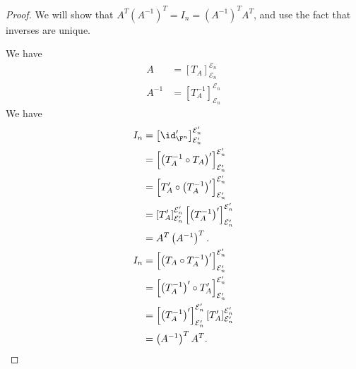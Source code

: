 \documentclass[10pt]{mypackage}
\begin{document}
\begin{proof}
  We will show that $A^{T} \left(A^{-1}\right)^{T} = I_n = \left(A^{-1}\right)^{T} A^T$, and use the fact that inverses are unique.\newline

  We have
  \begin{align*}
    A &= \left[T_A\right]_{\mathcal{E}_n}^{\mathcal{E}_n}\\
    A^{-1} &= \left[T_A^{-1}\right]_{\mathcal{E}_n}^{\mathcal{E}_n}
  \end{align*}
  We have
  \begin{align*}
    I_n &= \left[\id_{\F^n}'\right]_{\mathcal{E}_n'}^{\mathcal{E}_n'}\\
        &= \left[\left(T_A^{-1}\circ T_A\right)'\right]_{\mathcal{E}_n'}^{\mathcal{E}_n'}\\
        &= \left[T_A'\circ \left(T_A^{-1}\right)'\right]_{\mathcal{E}_n'}^{\mathcal{E}_n'}\\
        &= \left[T_A'\right]_{\mathcal{E}_n'}^{\mathcal{E}_n'}\left[\left(T_A^{-1}\right)'\right]_{\mathcal{E}_n'}^{\mathcal{E}_n'}\\
        &= A^T\left(A^{-1}\right)^T.\\
    I_n &= \left[\left(T_A\circ T_A^{-1}\right)'\right]_{\mathcal{E}_n'}^{\mathcal{E}_n'}\\
        &= \left[\left(T_A^{-1}\right)'\circ T_A'\right]_{\mathcal{E}_n'}^{\mathcal{E}_n'}\\
        &= \left[\left(T_A^{-1}\right)'\right]_{\mathcal{E}_n'}^{\mathcal{E}_n'}\left[T_A'\right]_{\mathcal{E}_n'}^{\mathcal{E}_n'}\\
        &= \left(A^{-1}\right)^{T}A^{T}.
  \end{align*}
\end{proof}
\end{document}
